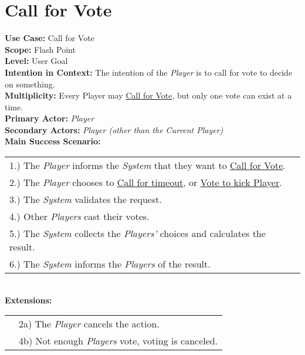 \documentclass{article}
\begin{document}
	\section*{Call for Vote}
	\textbf{Use Case:} Call for Vote\\
	\textbf{Scope:} Flash Point\\
	\textbf{Level:} User Goal\\
	\textbf{Intention in Context:} The intention of the \textit{Player} is to call for vote to decide on something.\\
	\textbf{Multiplicity: } Every Player may \underline{Call for Vote}, but only one vote can exist at a time.\\
	\textbf{Primary Actor:} \textit{Player}\\
	\textbf{Secondary Actors:} \textit{Player (other than the Current Player)}\\
	\textbf{Main Success Scenario:}\\
	\begin{tabular}{l l}
		1.) The \textit{Player} informs the \textit{System} that they want to \underline{Call for Vote}.\\
		2.) The \textit{Player} chooses to \underline{Call for timeout}, or \underline{Vote to kick Player}.\\
		3.) The \textit{System} validates the request.\\
		4.) Other \textit{Players} cast their votes.\\
		5.) The \textit{System} collects the \textit{Players'} choices and calculates the result.\\
		6.) The \textit{System} informs the \textit{Players} of the result.
	\end{tabular}\\
	\textbf{Extensions:}\\
	\begin{tabular}{l l}
		&2a) The \textit{Player} cancels the action.\\
		&4b) Not enough \textit{Players} vote, voting is canceled.
	\end{tabular}
\end{document}
